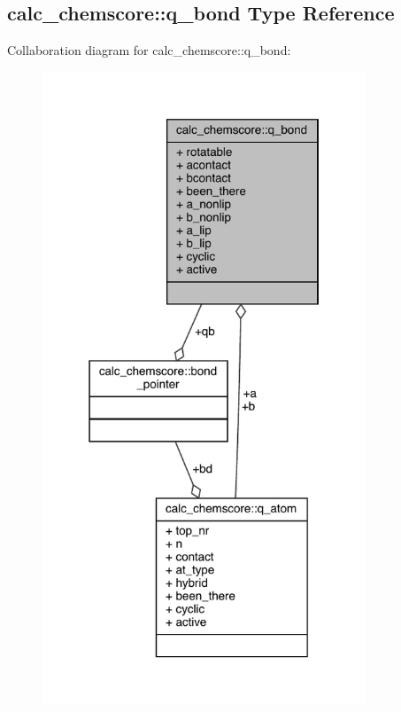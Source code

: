 \hypertarget{structcalc__chemscore_1_1q__bond}{\subsection{calc\-\_\-chemscore\-:\-:q\-\_\-bond Type Reference}
\label{structcalc__chemscore_1_1q__bond}
}


Collaboration diagram for calc\-\_\-chemscore\-:\-:q\-\_\-bond\-:
\nopagebreak
\begin{figure}[H]
\begin{center}
\leavevmode
\includegraphics[width=274pt]{structcalc__chemscore_1_1q__bond__coll__graph}
\end{center}
\end{figure}
